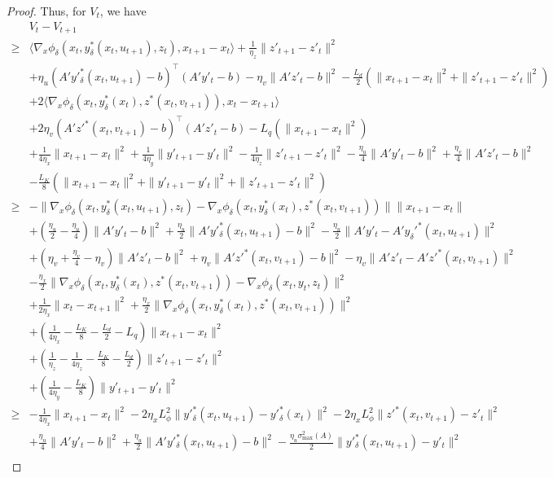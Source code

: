 \documentclass{article}
\newcommand{\pth}[1]{\left( #1 \right)}
\theoremstyle{plain}
\theoremstyle{definition}
\theoremstyle{remark}
\begin{document}
\begin{proof}
Thus, for $V_t$, we have
\begin{align*}
    &V_t-V_{t+1}\\
    \geq& \langle\nabla_x \phi_\delta(x_t, y^*_\delta(x_t, u_{t+1}), z_t), x_{t+1}-x_t\rangle+\frac{1}{\eta_z}\|z'_{t+1}-z'_t\|^2\\
    &+\eta_u(A'y'^*_\delta(x_t,u_{t+1})-b)^\top(A'y'_t-b)-\eta_v\|A'z'_t-b\|^2-\frac{L_d}{2}(\|x_{t+1}-x_t\|^2+\|z'_{t+1}-z'_t\|^2)\\
    &+2\langle\nabla_x \phi_\delta(x_t, y^*_\delta(x_t), z^*(x_t, v_{t+1})), x_t-x_{t+1}\rangle\\
    &+2\eta_v(A'z'^*(x_t,v_{t+1})-b)^\top(A'z'_t-b)-L_q(\|x_{t+1}-x_t\|^2)\\
    &+\frac{1}{4\eta_x}\|x_{t+1}-x_t\|^2+\frac{1}{4\eta_y}\|y'_{t+1}-y'_t\|^2-\frac{1}{4\eta_z}\|z'_{t+1}-z'_t\|^2-\frac{\eta_u}{4}\|A'y'_t-b\|^2+\frac{\eta_v}{4}\|A'z'_t-b\|^2\\
    &-\frac{L_K}{8}(\|x_{t+1}-x_t\|^2+\|y'_{t+1}-y'_t\|^2+\|z'_{t+1}-z'_t\|^2)\\
    \geq&-\|\nabla_x \phi_\delta(x_t, y^*_\delta(x_t, u_{t+1}), z_t)-\nabla_x \phi_\delta(x_t, y^*_\delta(x_t), z^*(x_t, v_{t+1}))\|\|x_{t+1}-x_t\|\\
    &+\pth{\frac{\eta_u}{2}-\frac{\eta_u}{4}}\|A'y'_t-b\|^2+\frac{\eta_u}{2}\|A'y'^*_\delta(x_t,u_{t+1})-b\|^2-\frac{\eta_u}{2}\|A'y'_t-A'y_\delta'^*(x_{t},u_{t+1})\|^2\\
    &+\pth{\eta_v+\frac{\eta_v}{4}-\eta_v}\|A'z'_t-b\|^2+\eta_v\|A'z'^*(x_{t},v_{t+1})-b\|^2-\eta_v\|A'z'_t-A'z'^*(x_{t},v_{t+1})\|^2\\
    &-\frac{\eta_x}{2}\|\nabla_x \phi_\delta(x_t, y^*_\delta(x_t), z^*(x_t, v_{t+1}))-\nabla_x \phi_\delta(x_t, y_t, z_t)\|^2\\
    &+\frac{1}{2\eta_x}\|x_t-x_{t+1}\|^2+\frac{\eta_x}{2}\|\nabla_x \phi_\delta(x_t, y^*_\delta(x_t), z^*(x_t, v_{t+1}))\|^2\\
    &+\pth{\frac{1}{4\eta_x}-\frac{L_K}{8}-\frac{L_d}{2}-L_q}\|x_{t+1}-x_t\|^2\\
    &+\pth{\frac{1}{\eta_z}-\frac{1}{4\eta_z}-\frac{L_K}{8}-\frac{L_d}{2}}\|z'_{t+1}-z'_t\|^2\\
    &+\pth{\frac{1}{4\eta_y}-\frac{L_K}{8}}\|y'_{t+1}-y'_t\|^2\\
    \geq&-\frac{1}{4\eta_x}\|x_{t+1}-x_t\|^2-2\eta_xL_\phi^2\|y'^*_\delta(x_t,u_{t+1})-y'^*_\delta(x_t)\|^2-2\eta_xL_\phi^2\|z'^*(x_t,v_{t+1})-z'_t\|^2\\
    &+\frac{\eta_u}{4}\|A'y'_t-b\|^2+\frac{\eta_u}{2}\|A'y'^*_\delta(x_t,u_{t+1})-b\|^2-\frac{\eta_u \sigma_{\max}^2(A)}{2}\|y'^*_\delta(x_t,u_{t+1})-y'_t\|^2\\

\end{align*}
\end{proof}
\end{document}
